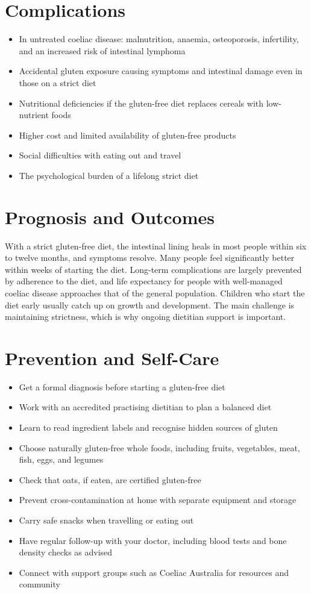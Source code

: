 \section*{Complications}
\begin{itemize}
    \item In untreated coeliac disease: malnutrition, anaemia, osteoporosis, infertility, and an increased risk of intestinal lymphoma
    \item Accidental gluten exposure causing symptoms and intestinal damage even in those on a strict diet
    \item Nutritional deficiencies if the gluten-free diet replaces cereals with low-nutrient foods
    \item Higher cost and limited availability of gluten-free products
    \item Social difficulties with eating out and travel
    \item The psychological burden of a lifelong strict diet
\end{itemize}

\section*{Prognosis and Outcomes}
With a strict gluten-free diet, the intestinal lining heals in most people within six to twelve months, and symptoms resolve. Many people feel significantly better within weeks of starting the diet. Long-term complications are largely prevented by adherence to the diet, and life expectancy for people with well-managed coeliac disease approaches that of the general population. Children who start the diet early usually catch up on growth and development. The main challenge is maintaining strictness, which is why ongoing dietitian support is important.

\section*{Prevention and Self-Care}
\begin{itemize}
    \item Get a formal diagnosis before starting a gluten-free diet
    \item Work with an accredited practising dietitian to plan a balanced diet
    \item Learn to read ingredient labels and recognise hidden sources of gluten
    \item Choose naturally gluten-free whole foods, including fruits, vegetables, meat, fish, eggs, and legumes
    \item Check that oats, if eaten, are certified gluten-free
    \item Prevent cross-contamination at home with separate equipment and storage
    \item Carry safe snacks when travelling or eating out
    \item Have regular follow-up with your doctor, including blood tests and bone density checks as advised
    \item Connect with support groups such as Coeliac Australia for resources and community
\end{itemize}

